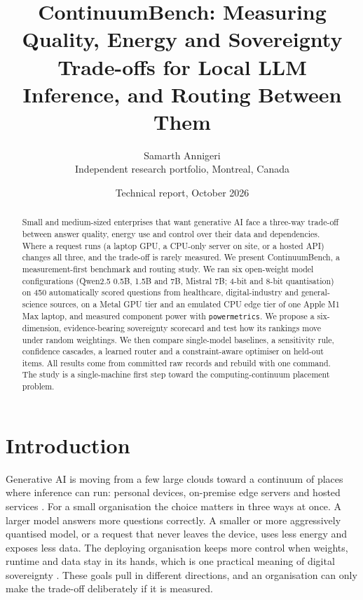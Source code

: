 \documentclass[10pt,twocolumn]{article}
\title{\textbf{ContinuumBench: Measuring Quality, Energy and Sovereignty Trade-offs for Local LLM Inference, and Routing Between Them}}
\author{Samarth Annigeri\\Independent research portfolio, Montreal, Canada}
\date{Technical report, October 2026}
\begin{document}
\maketitle

\begin{abstract}
Small and medium-sized enterprises that want generative AI face a three-way trade-off between answer quality, energy use and control over their data and dependencies. Where a request runs (a laptop GPU, a CPU-only server on site, or a hosted API) changes all three, and the trade-off is rarely measured. We present ContinuumBench, a measurement-first benchmark and routing study. We ran six open-weight model configurations (Qwen2.5 0.5B, 1.5B and 7B, Mistral 7B; 4-bit and 8-bit quantisation) on 450 automatically scored questions from healthcare, digital-industry and general-science sources, on a Metal GPU tier and an emulated CPU edge tier of one Apple M1 Max laptop, and measured component power with \texttt{powermetrics}. We propose a six-dimension, evidence-bearing sovereignty scorecard and test how its rankings move under random weightings. We then compare single-model baselines, a sensitivity rule, confidence cascades, a learned router and a constraint-aware optimiser on held-out items.  All results come from committed raw records and rebuild with one command. The study is a single-machine first step toward the computing-continuum placement problem.
\end{abstract}

\section{Introduction}
Generative AI is moving from a few large clouds toward a continuum of places where inference can run: personal devices, on-premise edge servers and hosted services \cite{satya2017,shi2016,deng2020,ding2022roadmap}. For a small organisation the choice matters in three ways at once. A larger model answers more questions correctly. A smaller or more aggressively quantised model, or a request that never leaves the device, uses less energy and exposes less data. The deploying organisation keeps more control when weights, runtime and data stay in its hands, which is one practical meaning of digital sovereignty \cite{esposito2026}. These goals pull in different directions, and an organisation can only make the trade-off deliberately if it is measured.
\end{document}
